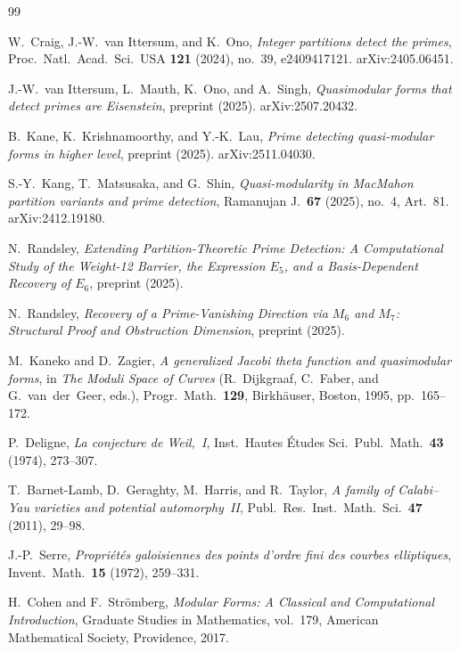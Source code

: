 \documentclass[11pt]{article}
\begin{document}
\begin{thebibliography}{99}

W.~Craig, J.-W.~van Ittersum, and K.~Ono,
\emph{Integer partitions detect the primes},
Proc.\ Natl.\ Acad.\ Sci.\ USA \textbf{121} (2024), no.~39, e2409417121.
\newblock arXiv:2405.06451.

J.-W.~van Ittersum, L.~Mauth, K.~Ono, and A.~Singh,
\emph{Quasimodular forms that detect primes are Eisenstein},
preprint (2025).
\newblock arXiv:2507.20432.

B.~Kane, K.~Krishnamoorthy, and Y.-K.~Lau,
\emph{Prime detecting quasi-modular forms in higher level},
preprint (2025).
\newblock arXiv:2511.04030.

S.-Y.~Kang, T.~Matsusaka, and G.~Shin,
\emph{Quasi-modularity in MacMahon partition variants and prime detection},
Ramanujan J.\ \textbf{67} (2025), no.~4, Art.~81.
\newblock arXiv:2412.19180.

N.~Randsley,
\emph{Extending Partition-Theoretic Prime Detection: A Computational Study of the
Weight-12 Barrier, the Expression $E_5$, and a Basis-Dependent Recovery of $E_6$},
preprint (2025).

N.~Randsley,
\emph{Recovery of a Prime-Vanishing Direction via $M_6$ and $M_7$:
Structural Proof and Obstruction Dimension},
preprint (2025).

M.~Kaneko and D.~Zagier,
\emph{A generalized Jacobi theta function and quasimodular forms},
in \textit{The Moduli Space of Curves}
  (R.~Dijkgraaf, C.~Faber, and G.~van~der~Geer, eds.),
Progr.\ Math.\ \textbf{129}, Birkh\"auser, Boston, 1995, pp.~165--172.

P.~Deligne,
\emph{La conjecture de Weil,~I},
Inst.\ Hautes \'Etudes Sci.\ Publ.\ Math.\ \textbf{43} (1974), 273--307.

T.~Barnet-Lamb, D.~Geraghty, M.~Harris, and R.~Taylor,
\emph{A family of Calabi--Yau varieties and potential automorphy~II},
Publ.\ Res.\ Inst.\ Math.\ Sci.\ \textbf{47} (2011), 29--98.

J.-P.~Serre,
\emph{Propri\'et\'es galoisiennes des points d'ordre fini des courbes elliptiques},
Invent.\ Math.\ \textbf{15} (1972), 259--331.

H.~Cohen and F.~Str\"omberg,
\emph{Modular Forms: A Classical and Computational Introduction},
Graduate Studies in Mathematics, vol.~179, American Mathematical Society,
Providence, 2017.

\end{thebibliography}


\end{document}
